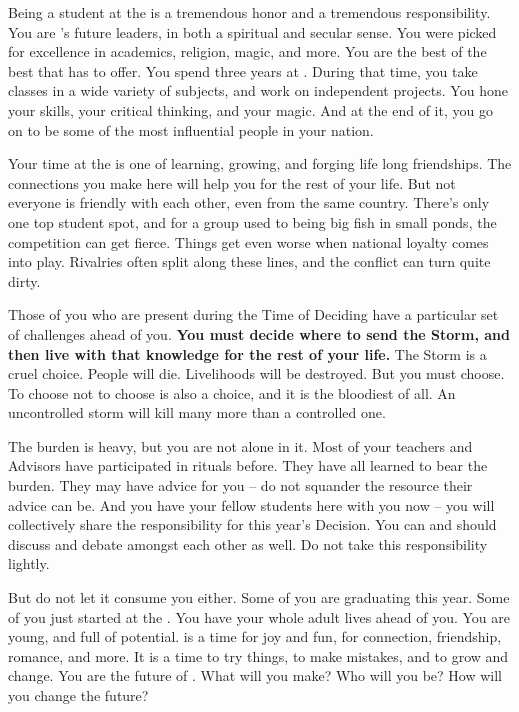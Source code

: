 \documentclass[blue]{GL2020}
\begin{document}
\name{\bStudentBlue{}}

Being a student at the \pSchool{} is a tremendous honor and a tremendous responsibility. You are \pEarth{}'s future leaders, in both a spiritual and secular sense. You were picked for excellence in academics, religion, magic, and more. You are the best of the best that \pEarth{} has to offer. You spend three years at \pSchool{}. During that time, you take classes in a wide variety of subjects, and work on independent projects. You hone your skills, your critical thinking, and your magic. And at the end of it, you go on to be some of the most influential people in your nation.

Your time at the \pSc{} is one of learning, growing, and forging life long friendships. The connections you make here will help you for the rest of your life. But not everyone is friendly with each other, even from the same country. There's only one top student spot, and for a group used to being big fish in small ponds, the competition can get fierce. Things get even worse when national loyalty comes into play. Rivalries often split along these lines, and the conflict can turn quite dirty.

Those of you who are present during the Time of Deciding have a particular set of challenges ahead of you. \textbf{You must decide where to send the Storm, and then live with that knowledge for the rest of your life.} The Storm is a cruel choice. People will die. Livelihoods will be destroyed. But you must choose. To choose not to choose is also a choice, and it is the bloodiest of all. An uncontrolled storm will kill many more than a controlled one.

The burden is heavy, but you are not alone in it. Most of your teachers and Advisors have participated in rituals before. They have all learned to bear the burden. They may have advice for you -- do not squander the resource their advice can be. And you have your fellow students here with you now -- you will collectively share the responsibility for this year's Decision. You can and should discuss and debate amongst each other as well. Do not take this responsibility lightly.

But do not let it consume you either. Some of you are graduating this year. Some of you just started at the \pSchool{}. You have your whole adult lives ahead of you. You are young, and full of potential. \pSc{} is a time for joy and fun, for connection, friendship, romance, and more. It is a time to try things, to make mistakes, and to grow and change. You are the future of \pEarth{}. What will you make? Who will you be? How will you change the future?
\end{document}
